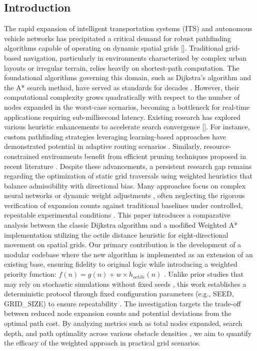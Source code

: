 \subsection{Introduction}
The rapid expansion of intelligent transportation systems (ITS) and autonomous vehicle networks has precipitated a critical demand for robust pathfinding algorithms capable of operating on dynamic spatial grids [\cite{jain2025graph}]. Traditional grid-based navigation, particularly in environments characterized by complex urban layouts or irregular terrain, relies heavily on shortest-path computation. The foundational algorithms governing this domain, such as Dijkstra's algorithm and the A* search method, have served as standards for decades \cite{ahmadi2024efficient}. However, their computational complexity grows quadratically with respect to the number of nodes expanded in the worst-case scenarios, becoming a bottleneck for real-time applications requiring sub-millisecond latency.\n
Existing research has explored various heuristic enhancements to accelerate search convergence [\cite{tang2025routing}]. For instance, custom pathfinding strategies leveraging learning-based approaches have demonstrated potential in adaptive routing scenarios \cite{murjani2026alpharoute}. Similarly, resource-constrained environments benefit from efficient pruning techniques proposed in recent literature \cite{ahmadi2024resource}. Despite these advancements, a persistent research gap remains regarding the optimization of static grid traversals using weighted heuristics that balance admissibility with directional bias. Many approaches focus on complex neural networks or dynamic weight adjustments \cite{yang2026generating}, often neglecting the rigorous verification of expansion counts against traditional baselines under controlled, repeatable experimental conditions \cite{tang2026scaling}.\n
This paper introduces a comparative analysis between the classic Dijkstra algorithm and a modified Weighted A* implementation utilizing the octile distance heuristic for eight-directional movement on spatial grids. Our primary contribution is the development of a modular codebase where the new algorithm is implemented as an extension of an existing base, ensuring fidelity to original logic while introducing a weighted priority function: $f(n) = g(n) + w \times h_{octile}(n)$ \cite{wah2016heuristics}. Unlike prior studies that may rely on stochastic simulations without fixed seeds \cite{bao2024survey}, this work establishes a deterministic protocol through fixed configuration parameters (e.g., SEED, GRID_SIZE) to ensure repeatability \cite{wang2026vikpath}. The investigation targets the trade-off between reduced node expansion counts and potential deviations from the optimal path cost. By analyzing metrics such as total nodes expanded, search depth, and path optimality across various obstacle densities \cite{elela2024deep}, we aim to quantify the efficacy of the weighted approach in practical grid scenarios.\n

